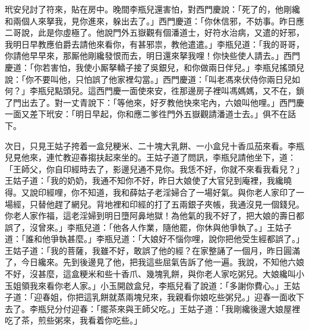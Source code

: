 玳安兒討了符來，貼在房中。晚間李瓶兒還害怕，對西門慶說：「死了的，他剛纔和兩個人來拏我，見你進來，躲出去了。」西門慶道：「你休信邪，不妨事。昨日應二哥說，此是你虛極了。他說門外五嶽觀有個潘道士，好符水治病，又遣的好邪，我明日早教應伯爵去請他來看你，有甚邪祟，教他遣遣。」李瓶兒道：「我的哥哥，你請他早早來，那厮他剛纔發恨而去，明日還來拏我哩！你快些使人請去。」西門慶道：「你若害怕，我使小厮拏轎子接了吳銀兒，和你做兩日伴兒。」李瓶兒搖頭兒說：「你不要叫他，只怕誤了他家裡勾當。」西門慶道：「叫老馮來伏侍你兩日兒如何？」李瓶兒點頭兒。這西門慶一面使來安，徃那邊房子裡叫馮媽媽，又不在，鎖了門出去了。對一丈青說下：「等他來，好歹教他快來宅內，六娘叫他哩。」西門慶一面又差下玳安：「明日早起，你和應二爹徃門外五嶽觀請潘道士去。」俱不在話下。

次日，只見王姑子挎着一盒兒粳米、二十塊大乳餅、一小盒兒十香瓜茄來看。李瓶兒見他來，連忙教迎春搊扶起來坐的。王姑子道了問訊，李瓶兒請他坐下，道：「王師父，你自印經時去了，影邊兒通不見你。我恁不好，你就不來看我看兒？」王姑子道：「我的奶奶，我通不知你不好，昨日大娘使了大官兒到庵裡，我纔曉得。又說印經哩，你不知道，我和薛姑子老淫婦合了一場好氣。與你老人家印了一場經，只替他趕了網兒。背地裡和印經的打了五兩銀子夾帳，我通沒見一個錢兒。你老人家作福，這老淫婦到明日墮阿鼻地獄！{}為他氣的我不好了，把大娘的壽日都誤了，沒曾來。」李瓶兒道：「他各人作業，隨他罷，你休與他爭執了。」王姑子道：「誰和他爭執甚麼。」李瓶兒道：「大娘好不惱你哩，說你把他受生經都誤了。」王姑子道：「我的菩薩，我雖不好，敢誤了他的經？在家整誦了一個月，昨日圓滿了，今日纔來。先到後邊見了他，把我這些屈氣告訴了他一遍。我說，不知他六娘不好，沒甚麼，這盒粳米和些十香爪、幾塊乳餅，與你老人家吃粥兒。大娘纔叫小玉姐領我來看你老人家。」小玉開啟盒兒，李瓶兒看了說道：「多謝你費心。」王姑子道：「迎春姐，你把這乳餅就蒸兩塊兒來，我親看你娘吃些粥兒。」迎春一面收下去了。李瓶兒分付迎春：「擺茶來與王師父吃。」王姑子道：「我剛纔後邊大娘屋裡吃了茶，煎些粥來，我看着你吃些。」

